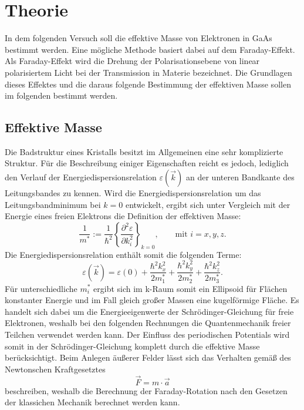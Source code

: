 \section{Theorie}
\label{sec:Theorie}

In dem folgenden Versuch soll die effektive Masse von Elektronen in GaAs bestimmt
werden. Eine mögliche Methode basiert dabei auf dem Faraday-Effekt. Als Faraday-Effekt
wird die Drehung der Polarisationsebene von linear polarisiertem
Licht bei der Transmission in Materie bezeichnet. Die Grundlagen dieses Effektes und die
daraus folgende Bestimmung der effektiven Masse sollen im folgenden bestimmt werden.

\subsection{Effektive Masse}
\label{subsec:Masse}

Die Badstruktur eines Kristalls besitzt im Allgemeinen eine sehr komplizierte
Struktur. Für die Beschreibung einiger Eigenschaften reicht es jedoch, lediglich
den Verlauf der Energiedispersionsrelation $\varepsilon(\vec{k})$ an der unteren
Bandkante des Leitungsbandes zu kennen. Wird die Energiedispersionsrelation
um das Leitungsbandminimum bei $k=0$ entwickelt, ergibt sich unter Vergleich mit der
Energie eines freien Elektrons die Definition der effektiven Masse:
\begin{equation}
  \frac{1}{m^*} := \frac{1}{\hbar^2}\left\{\frac{\partial^2\varepsilon}{\partial k_i^2}\right\}_{k=0}, \qquad\text{mit }i = x, y, z.
  \label{eqn:effMass}
\end{equation}
Die Energiedispersionsrelation enthält somit die folgenden Terme:
\begin{equation}
  \varepsilon(\vec{k}) = \varepsilon(0) + \frac{\hbar^2k_x^2}{2m^*_1}  + \frac{\hbar^2k_y^2}{2m^*_2} + \frac{\hbar^2k_z^2}{2m^*_3}.
  \label{eqn:Energie}
\end{equation}
Für unterschiedliche $m^*_i$ ergibt sich im k-Raum somit ein Ellipsoid für Flächen
konstanter Energie und im Fall gleich großer Massen eine kugelförmige Fläche.
Es handelt sich dabei um die Energieeigenwerte der Schrödinger-Gleichung für
freie Elektronen, weshalb bei den folgenden Rechnungen die Quantenmechanik
freier Teilchen verwendet werden kann. Der Einfluss des periodischen Potentials
wird somit in der Schrödinger-Gleichung komplett durch die effektive Masse
berücksichtigt. Beim Anlegen äußerer Felder lässt sich das Verhalten gemäß
des Newtonschen Kraftgesetztes
\begin{equation}
  \vec{F} = m\cdot\vec{a}
  \label{eqn:Newton2}
\end{equation}
beschreiben, weshalb die Berechnung der Faraday-Rotation nach den Gesetzen der klassichen
Mechanik berechnet werden kann.

